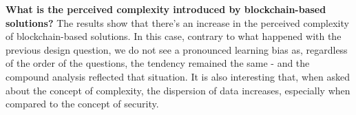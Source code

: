 \textbf{What is the perceived complexity introduced by blockchain-based solutions?} The results show that there's an increase in the perceived complexity of blockchain-based solutions. In this case, contrary to what happened with the previous design question, we do not see a pronounced learning bias as, regardless of the order of the questions, the tendency remained the same - and the compound analysis reflected that situation. It is also interesting that, when asked about the concept of complexity, the dispersion of data increases, especially when compared to the concept of security.